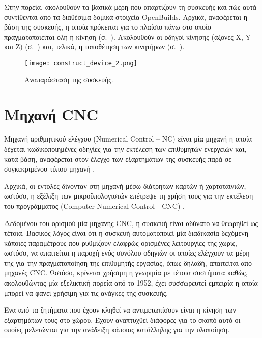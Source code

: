 Στην πορεία, ακολουθούν τα βασικά μέρη που απαρτίζουν τη συσκευής και πώς αυτά
συντίθενται από τα διαθέσιμα δομικά στοιχεία OpenBuilds. Αρχικά, αναφέρεται η
βάση της συσκευής, η οποία πρόκειται για το πλαίσιο πάνω στο οποίο
πραγματοποιείται όλη η κίνηση (σ.~\pageref{sec:construct:base}). Ακολουθούν οι
οδηγοί κίνησης (άξονες X, Y και Z) (σ.~\pageref{sec:construct:axes}) και,
τελικά, η τοποθέτηση των κινητήρων (σ.~\pageref{sec:construct:motors}).

\begin{figure}
    \caption{Αναπαράσταση της συσκευής.\label{fig:construct:device}}
    \begin{center}%
    \texttt{[image: construct\_device\_2.png]}
    \end{center}
\end{figure}

\section{Μηχανή CNC}
\label{sec:construct:cnc}

Μηχανή αριθμητικού ελέγχου (Numerical Control -- NC) είναι μία μηχανή η οποία δέχεται κωδικοποιημένες οδηγίες για την
εκτέλεση των επιθυμητών ενεργειών και, κατά βάση, αναφέρεται στον έλεγχο των
εξαρτημάτων της συσκευής παρά σε συγκεκριμένου τύπου μηχανή
\parencites{seames01}{albert11}.

Αρχικά, οι εντολές δίνονταν στη μηχανή μέσω διάτρητων καρτών ή χαρτοταινιών,
ωστόσο, η εξέλιξη των μικροϋπολογιστών επέτρεψε τη χρήση τους για την εκτέλεση
του προγράμματος (Computer Numerical Control - CNC) \parencite{seames01}.

Δεδομένου του ορισμού μία μηχανής CNC, η συσκευή είναι αδύνατο να θεωρηθεί ως
τέτοια. Βασικός λόγος είναι ότι η συσκευή αυτοματοποιεί μία διαδικασία δεχόμενη
κάποιες παραμέτρους που ρυθμίζουν ελαφρώς ορισμένες λειτουργίες της χωρίς,
ωστόσο, να απαιτείται η παροχή ενός συνόλου οδηγιών οι οποίες ελέγχουν τα μέρη
της για την πραγματοποίηση της επιθυμητής εργασίας, όπως δηλαδή, απαιτείται από
μηχανές CNC.
Ωστόσο, κρίνεται χρήσιμη η γνωριμία με τέτοια συστήματα καθώς, ακολουθώντας μία
εξελικτική πορεία από το 1952, έχει συσσωρευτεί εμπειρία η οποία μπορεί να φανεί
χρήσιμη για τις ανάγκες της συσκευής.

Ένα από τα ζητήματα που έχουν κληθεί να αντιμετωπίσουν είναι η κίνηση των
εξαρτημάτων τους στο χώρου. Έχουν αναπτυχθεί διάφορες για το σκοπό αυτό οι
οποίες μελετώνται για την ανάδειξη κάποιας κατάλληλης για την υλοποίηση.


